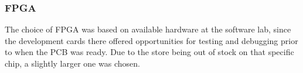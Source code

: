 
\subsubsection{FPGA}

The choice of FPGA was based on available hardware at the software lab, since
the development cards there offered opportunities for testing and debugging
prior to when the PCB was ready. Due to the store being out of stock on that
specific chip, a slightly larger one was chosen. 
